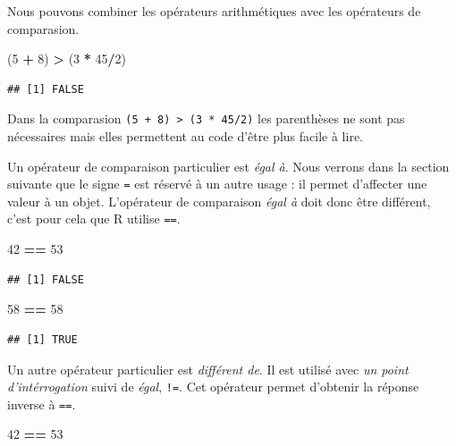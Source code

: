 \documentclass[]{book}
\newenvironment{Shaded}{\begin{snugshade}}{\end{snugshade}}
\newcommand{\DecValTok}[1]{\textcolor[rgb]{0.00,0.00,0.81}{#1}}
\newcommand{\NormalTok}[1]{#1}
\newcommand{\OperatorTok}[1]{\textcolor[rgb]{0.81,0.36,0.00}{\textbf{#1}}}
\newcommand{\StringTok}[1]{\textcolor[rgb]{0.31,0.60,0.02}{#1}}
\begin{document}
Nous pouvons combiner les opérateurs arithmétiques avec les opérateurs de comparasion.

\begin{Shaded}
\begin{Highlighting}[]
\NormalTok{(}\DecValTok{5} \OperatorTok{+}\StringTok{ }\DecValTok{8}\NormalTok{) }\OperatorTok{>}\StringTok{ }\NormalTok{(}\DecValTok{3} \OperatorTok{*}\StringTok{ }\DecValTok{45}\OperatorTok{/}\DecValTok{2}\NormalTok{) }
\end{Highlighting}
\end{Shaded}

\begin{verbatim}
## [1] FALSE
\end{verbatim}

Dans la comparasion \texttt{(5\ +\ 8)\ \textgreater{}\ (3\ *\ 45/2)} les parenthèses ne sont pas nécessaires mais elles permettent au code d'être plus facile à lire.

Un opérateur de comparaison particulier est \emph{égal à}. Nous verrons dans la section suivante que le signe \texttt{=} est réservé à un autre usage : il permet d'affecter une valeur à un objet. L'opérateur de comparaison \emph{égal à} doit donc être différent, c'est pour cela que R utilise \texttt{==}.

\begin{Shaded}
\begin{Highlighting}[]
\DecValTok{42} \OperatorTok{==}\StringTok{ }\DecValTok{53}
\end{Highlighting}
\end{Shaded}

\begin{verbatim}
## [1] FALSE
\end{verbatim}

\begin{Shaded}
\begin{Highlighting}[]
\DecValTok{58} \OperatorTok{==}\StringTok{ }\DecValTok{58}
\end{Highlighting}
\end{Shaded}

\begin{verbatim}
## [1] TRUE
\end{verbatim}

Un autre opérateur particulier est \emph{différent de}. Il est utilisé avec \emph{un point d'intérrogation} suivi de \emph{égal}, \texttt{!=}. Cet opérateur permet d'obtenir la réponse inverse à \texttt{==}.

\begin{Shaded}
\begin{Highlighting}[]
\DecValTok{42} \OperatorTok{==}\StringTok{ }\DecValTok{53}
\end{Highlighting}
\end{Shaded}
\end{document}
